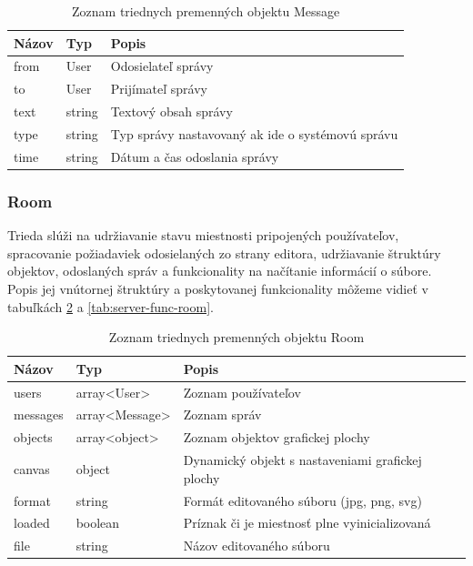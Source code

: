 \begin{table}
	\begin{tabular}{ | m{3cm} | m{3cm}| m{6.5cm} | } \hline
		\textbf{Názov} & \textbf{Typ} & \textbf{Popis} \\ \hline \hline
		
		from & User & Odosielateľ správy \\\hline
		to & User & Prijímateľ správy \\\hline
		text & string & Textový obsah správy \\\hline
		type & string & Typ správy nastavovaný ak ide o systémovú správu \\\hline
		time & string & Dátum a čas odoslania správy \\	\hline
	
		\hline
	\end{tabular}
	\caption{Zoznam triednych premenných objektu Message}
	\label{tab:server-prop-message}
\end{table}



\subsubsection{Room}
Trieda  slúži na udržiavanie stavu miestnosti pripojených používateľov, spracovanie požiadaviek odosielaných zo strany editora, udržiavanie štruktúry objektov, odoslaných správ a funkcionality na načítanie informácií o súbore. Popis jej vnútornej štruktúry a poskytovanej funkcionality môžeme vidieť v tabuľkách \ref{tab:server-prop-room} a \ref{tab:server-func-room}.

\begin{table}
	\begin{tabular}{ | m{3cm} | m{3cm}| m{6.5cm} | } \hline
		\textbf{Názov} & \textbf{Typ} & \textbf{Popis} \\ \hline \hline
	
		users & array<User> & Zoznam používateľov \\\hline
		messages & array<Message> & Zoznam správ \\\hline
		objects & array<object> & Zoznam objektov grafickej plochy \\\hline
		canvas & object & Dynamický objekt s nastaveniami grafickej plochy \\\hline
		format & string & Formát editovaného súboru (jpg, png, svg)\\\hline
		loaded & boolean & Príznak či je miestnosť plne vyinicializovaná \\\hline
		file & string & Názov editovaného súboru \\\hline
	
		\hline
	\end{tabular}
	\caption{Zoznam triednych premenných objektu Room}
	\label{tab:server-prop-room}
\end{table}


